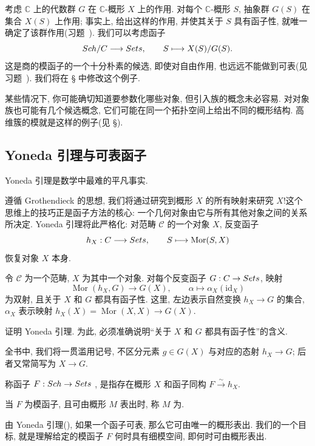\begin{example}[轨道的模函子]\label{src:1.3.11}
考虑 $\mathbb C$ 上的代数群 $G$ 在 $\mathbb C$-概形 $X$ 上的作用. 对每个 $\mathbb C$-概形 $S$, 抽象群 $G(S)$ 在集合 $X(S)$ 上作用; 事实上, 给出这样的作用, 并使其关于 $S$ 具有函子性, 就唯一确定了该群作用(习题~). 我们可以考虑函子
\[
Sch/C\longrightarrow Sets,\qquad S\longmapsto X(S)/G(S).
\]
这是商的模函子的一个十分朴素的候选, 即使对自由作用, 也远远不能做到可表(见习题~). 我们将在 \S{} 中修改这个例子.
\end{example}
某些情况下, 你可能确切知道要参数化哪些对象, 但引入族的概念未必容易. 对对象族也可能有几个候选概念, 它们可能在同一个拓扑空间上给出不同的概形结构. 高维簇的模就是这样的例子(见 \S{}).

\subsection{Yoneda 引理与可表函子}\label{src:1.3.3-subsection}
\begin{epigraph}
Yoneda 引理是数学中最难的平凡事实.
\end{epigraph}
遵循 Grothendieck 的思想, 我们将通过研究到概形 $X$ 的所有映射来研究 $X$!这个思维上的技巧正是函子方法的核心: 一个几何对象由它与所有其他对象之间的关系所决定. Yoneda 引理将此严格化: 对范畴 $\mathcal C$ 的一个对象 $X$, 反变函子
\[
h_X:C\longrightarrow Sets,\qquad S\longmapsto\operatorname{Mor}(S,X)
\]
恢复对象 $X$ 本身.

\begin{lemma}[Yoneda 引理]\label{src:1.3.12}
令 $\mathcal C$ 为一个范畴, $X$ 为其中一个对象. 对每个反变函子 $G:C\to Sets$, 映射
\[
\operatorname{Mor}(h_X,G)\longrightarrow G(X),\qquad
\alpha\longmapsto\alpha_X(\mathrm{id}_X)
\]
为双射, 且关于 $X$ 和 $G$ 都具有函子性. 这里, 左边表示自然变换 $h_X\to G$ 的集合, $\alpha_X$ 表示映射 $h_X(X)=\operatorname{Mor}(X,X)\to G(X)$.
\end{lemma}
\begin{exercise}[一生中至少应做一次]\label{src:1.3.13}
证明 Yoneda 引理. 为此, 必须准确说明``关于 $X$ 和 $G$ 都具有函子性''的含义.
\end{exercise}
\begin{caution}\label{src:1.3.14}
全书中, 我们将一贯滥用记号, 不区分元素 $g\in G(X)$ 与对应的态射 $h_X\to G$; 后者又常简写为 $X\to G$.
\end{caution}
\begin{definition}[可表函子与细模空间]\label{src:1.3.15}
称函子 $F:Sch\to Sets$ , 是指存在概形 $X$ 和函子同构 $F\xrightarrow{\sim}h_X$.

当 $F$ 为模函子, 且可由概形 $M$ 表出时, 称 $M$ 为.
\end{definition}
由 Yoneda 引理(), 如果一个函子可表, 那么它可由唯一的概形表出. 我们的一个目标, 就是理解给定的模函子 $F$ 何时具有细模空间, 即何时可由概形表出.

